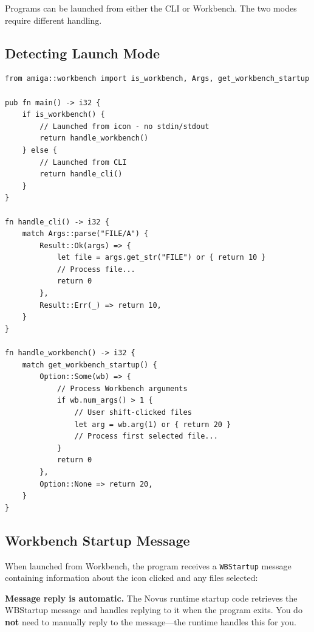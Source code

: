 Programs can be launched from either the CLI or Workbench. The two modes require different handling.

\subsection{Detecting Launch Mode}

\begin{lstlisting}
from amiga::workbench import is_workbench, Args, get_workbench_startup

pub fn main() -> i32 {
    if is_workbench() {
        // Launched from icon - no stdin/stdout
        return handle_workbench()
    } else {
        // Launched from CLI
        return handle_cli()
    }
}

fn handle_cli() -> i32 {
    match Args::parse("FILE/A") {
        Result::Ok(args) => {
            let file = args.get_str("FILE") or { return 10 }
            // Process file...
            return 0
        },
        Result::Err(_) => return 10,
    }
}

fn handle_workbench() -> i32 {
    match get_workbench_startup() {
        Option::Some(wb) => {
            // Process Workbench arguments
            if wb.num_args() > 1 {
                // User shift-clicked files
                let arg = wb.arg(1) or { return 20 }
                // Process first selected file...
            }
            return 0
        },
        Option::None => return 20,
    }
}
\end{lstlisting}

\subsection{Workbench Startup Message}

When launched from Workbench, the program receives a \texttt{WBStartup} message containing information about the icon clicked and any files selected:

\begin{notebox}
\textbf{Message reply is automatic.} The Novus runtime startup code retrieves the WBStartup message and handles replying to it when the program exits. You do \textbf{not} need to manually reply to the message---the runtime handles this for you.
\end{notebox}


